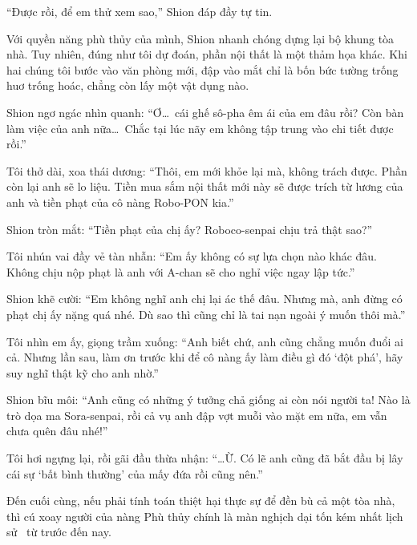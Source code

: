 \documentclass[../main.tex]{subfiles}
\begin{document}
``Được rồi, để em thử xem sao,'' Shion đáp đầy tự tin.

Với quyền năng phù thủy của mình, Shion nhanh chóng dựng lại bộ khung tòa nhà. Tuy nhiên, đúng như tôi dự đoán, phần nội thất là một thảm họa khác. Khi hai chúng tôi bước vào văn phòng mới, đập vào mắt chỉ là bốn bức tường trống huơ trống hoác, chẳng còn lấy một vật dụng nào.

Shion ngơ ngác nhìn quanh: ``Ơ\dots\ cái ghế sô-pha êm ái của em đâu rồi? Còn bàn làm việc của anh nữa\dots\ Chắc tại lúc nãy em không tập trung vào chi tiết được rồi.''

Tôi thở dài, xoa thái dương: ``Thôi, em mới khỏe lại mà, không trách được. Phần còn lại anh sẽ lo liệu. Tiền mua sắm nội thất mới này sẽ được trích từ lương của anh và tiền phạt của cô nàng Robo-PON kia.''

Shion tròn mắt: ``Tiền phạt của chị ấy? Roboco-senpai chịu trả thật sao?''

Tôi nhún vai đầy vẻ tàn nhẫn: ``Em ấy không có sự lựa chọn nào khác đâu. Không chịu nộp phạt là anh với A-chan sẽ cho nghỉ việc ngay lập tức.''

Shion khẽ cười: ``Em không nghĩ anh chị lại ác thế đâu. Nhưng mà, anh đừng có phạt chị ấy nặng quá nhé. Dù sao thì cũng chỉ là tai nạn ngoài ý muốn thôi mà.''

Tôi nhìn em ấy, giọng trầm xuống: ``Anh biết chứ, anh cũng chẳng muốn đuổi ai cả. Nhưng lần sau, làm ơn trước khi để cô nàng ấy làm điều gì đó `đột phá', hãy suy nghĩ thật kỹ cho anh nhờ.''

Shion bĩu môi: ``Anh cũng có những ý tưởng chả giống ai còn nói người ta! Nào là trò dọa ma Sora-senpai, rồi cả vụ anh đập vợt muỗi vào mặt em nữa, em vẫn chưa quên đâu nhé!''

Tôi hơi ngựng lại, rồi gãi đầu thừa nhận: ``\dots Ừ. Có lẽ anh cũng đã bắt đầu bị lây cái sự `bất bình thường' của mấy đứa rồi cũng nên.''

Đến cuối cùng, nếu phải tính toán thiệt hại thực sự để đền bù cả một tòa nhà, thì cú xoay người của nàng Phù thủy chính là màn nghịch dại tốn kém nhất lịch sử \hll\ từ trước đến nay.
\end{document}
